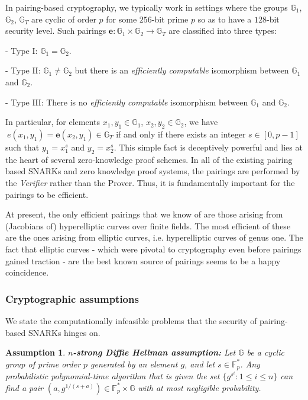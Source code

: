 \documentclass[a4paper, 11pt]{scrreprt}
\newtheorem{Ass}{Assumption}[section]
\numberwithin{equation}{section}
\newcommand{\bFp}{\mathbb{F}_p}
\newcommand{\lra}{\longrightarrow}
\newcommand{\mb}{\mathbb}
\newcommand{\mr}{\mathrm}
\newcommand{\e}{\mathbf{e}}
\theoremstyle{plain}
\begin{document}
In pairing-based cryptography, we typically work in settings where the groups $\mb{G}_1$, $\mb{G}_2$, $\mb{G}_T$ are cyclic of order $p$ for some $256$-bit prime $p$ so as to have a $128$-bit security level. Such pairings $\mathbf{e}:\mb{G}_1\times \mb{G}_2 \lra \mb{G}_T$ are classified into three types:

\noindent - Type $\mr{I}$: $\mb{G}_1 = \mb{G}_2$.

\noindent - Type $\mr{II}$: $\mb{G}_1 \neq \mb{G}_2$ but there is an \textit{efficiently computable} isomorphism between $\mb{G}_1$ and $\mb{G}_2$.

\noindent - Type $\mr{III}$: There is no \textit{efficiently computable} isomorphism between $\mb{G}_1$ and $\mb{G}_2$.

In particular, for elements $x_1,y_1\in \mb{G}_1$, $x_2,y_2\in \mb{G}_2$, we have $\ e(x_1,y_1) = \e(x_2,y_1)\in \mb{G}_T$ if and only if there exists an integer $s\in [0,p-1]$ such that $y_1 = x_1^s$ and $y_2 = x_2^s$. This simple fact is deceptively powerful and lies at the heart of several zero-knowledge proof schemes. In all of the existing pairing based SNARKs and zero knowledge proof systems, the pairings are performed by the \textit{Verifier} rather than the Prover. Thus, it is fundamentally important for the pairings to be efficient. 


At present, the only efficient pairings that we know of are those arising from (Jacobians of) hyperelliptic curves over finite fields. The most efficient of these are the ones arising from elliptic curves, i.e. hyperelliptic curves of genus one. The fact that elliptic curves - which were pivotal to cryptography even before pairings gained traction - are the best known source of pairings seems to be a happy coincidence.



\subsubsection{\fontsize{11}{11}\selectfont Cryptographic assumptions}



We state the computationally infeasible problems that the security of pairing-based SNARKs hinges on.

\begin{Ass} {\normalfont \textbf{{$n$-strong Diffie Hellman assumption:}}} Let $\mb{G}$ be a cyclic group of prime order $p$ generated by an element $g$, and let $s \in \bFp^*$. Any probabilistic polynomial-time algorithm that is given the set $\{g^{s^i}: 1\leq i\leq n \}$ can find a pair $(a, g^{1/(s+a)})\in \bFp^*\times \mb{G}$ with at most negligible probability.\end{Ass}
\end{document}
